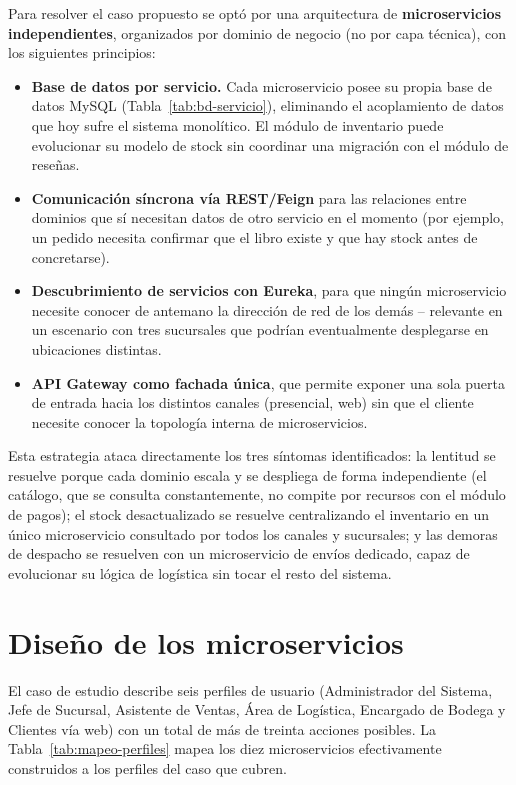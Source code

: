 Para resolver el caso propuesto se optó por una arquitectura de
\textbf{microservicios independientes}, organizados por dominio de negocio (no por
capa técnica), con los siguientes principios:

\begin{itemize}
    \item \textbf{Base de datos por servicio.} Cada microservicio posee su propia base
    de datos MySQL (Tabla~\ref{tab:bd-servicio}), eliminando el acoplamiento de datos
    que hoy sufre el sistema monolítico. El módulo de inventario puede evolucionar su
    modelo de stock sin coordinar una migración con el módulo de reseñas.
    \item \textbf{Comunicación síncrona vía REST/Feign} para las relaciones entre
    dominios que sí necesitan datos de otro servicio en el momento (por ejemplo, un
    pedido necesita confirmar que el libro existe y que hay stock antes de
    concretarse).
    \item \textbf{Descubrimiento de servicios con Eureka}, para que ningún
    microservicio necesite conocer de antemano la dirección de red de los demás --
    relevante en un escenario con tres sucursales que podrían eventualmente desplegarse
    en ubicaciones distintas.
    \item \textbf{API Gateway como fachada única}, que permite exponer una sola puerta
    de entrada hacia los distintos canales (presencial, web) sin que el cliente
    necesite conocer la topología interna de microservicios.
\end{itemize}

Esta estrategia ataca directamente los tres síntomas identificados: la lentitud se
resuelve porque cada dominio escala y se despliega de forma independiente (el catálogo,
que se consulta constantemente, no compite por recursos con el módulo de pagos); el
stock desactualizado se resuelve centralizando el inventario en un único microservicio
consultado por todos los canales y sucursales; y las demoras de despacho se resuelven
con un microservicio de envíos dedicado, capaz de evolucionar su lógica de logística sin
tocar el resto del sistema.

\section{Diseño de los microservicios}

El caso de estudio describe seis perfiles de usuario (Administrador del Sistema, Jefe
de Sucursal, Asistente de Ventas, Área de Logística, Encargado de Bodega y Clientes vía
web) con un total de más de treinta acciones posibles. La Tabla~\ref{tab:mapeo-perfiles}
mapea los diez microservicios efectivamente construidos a los perfiles del caso que
cubren.


